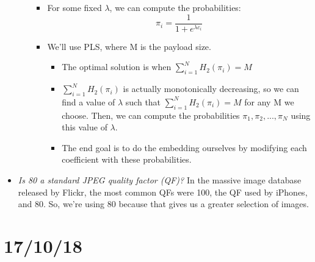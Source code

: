 \documentclass[11pt,a4paper]{report}
\begin{document}
\begin{itemize}
\begin{enumerate}
\begin{itemize}
    \item For some fixed $\lambda$, we can compute the probabilities:
      \begin{equation*}
      \pi_i = \frac{1}{1+e^{\lambda c_i}}
      \end{equation*}

    \item We'll use PLS, where M is the payload size.
      \begin{itemize}
      \item The optimal solution is when $\sum\limits_{i=1}^N H_2(\pi_i) = M$
      \item $\sum\limits_{i=1}^N H_2(\pi_i)$ is actually monotonically decreasing, so we can find a value of $\lambda$ such that $\sum\limits_{i=1}^N H_2(\pi_i) = M$ for any M we choose. Then, we can compute the probabilities $\pi_1, \pi_2, ..., \pi_N$ using this value of $\lambda$.
      \item The end goal is to do the embedding ourselves by modifying each coefficient with these probabilities.
      \end{itemize}
    \end{itemize}

  \end{enumerate}

\item \textit{Is 80 a standard JPEG quality factor (QF)?} In the massive image database released by Flickr, the most common QFs were 100, the QF used by iPhones, and 80. So, we're using 80 because that gives us a greater selection of images.

\end{itemize}


\section{17/10/18}
\end{document}
